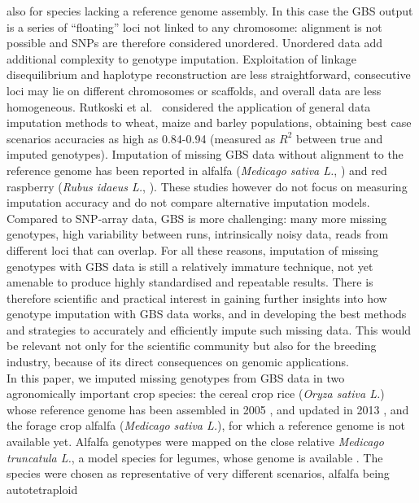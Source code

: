 also for species lacking a reference genome assembly. In this case the 
GBS output is a series of ``floating'' loci not linked to any chromosome:
alignment is not possible and SNPs are therefore considered unordered. Unordered 
data add additional complexity to genotype imputation. Exploitation of linkage 
disequilibrium and haplotype reconstruction 
are less straightforward, consecutive loci may lie on different chromosomes
or scaffolds, and overall data are less homogeneous.
Rutkoski et al.~\cite{rutkoski_imputation_2013}
considered the application of general data imputation methods 
to wheat, maize and barley populations, obtaining best case scenarios accuracies 
as high as 0.84-0.94 (measured as $R^{2}$ between true and imputed genotypes).
Imputation of missing GBS data without alignment to the reference genome has
been reported in alfalfa (\emph{Medicago sativa L.}, \cite{Rocher_validation_2015})
and red raspberry (\emph{Rubus idaeus L.}, \cite{ward_saturated_2013}). These studies
however do not focus on measuring imputation accuracy and do not compare
alternative imputation models.\\
	Compared to SNP-array data, GBS is more challenging: many more 
	missing genotypes, high variability between runs, intrinsically noisy data, 
	reads from different loci that can overlap. For all these reasons, imputation 
	of missing genotypes with GBS data is still a relatively immature technique, 
	not yet amenable to produce highly standardised and repeatable results. 
There is therefore scientific and practical interest in gaining further 
insights into how genotype imputation with GBS data works, and in 
developing the best methods and strategies to accurately and efficiently 
impute such missing data. This would be relevant not only for the scientific 
community but also for the breeding industry, because of its direct 
consequences on genomic applications.\\
In this paper, we imputed missing genotypes from GBS data in two agronomically
important crop species:
the cereal crop rice (\emph{Oryza sativa L.}) whose reference genome has been 
assembled in 2005 \cite{international_rice_genome_sequencing_project_map-based_2005},
and updated in 2013 \cite{kawahara_improvement_2013},
and
the forage crop alfalfa (\emph{Medicago sativa L.}), for 
which a reference genome is not available yet. Alfalfa genotypes
were mapped on the close relative \emph{Medicago truncatula L.}, a model species
for legumes, whose genome is available \cite{young_medicago_2011}.
The species were chosen as representative of very different scenarios, alfalfa being autotetraploid
